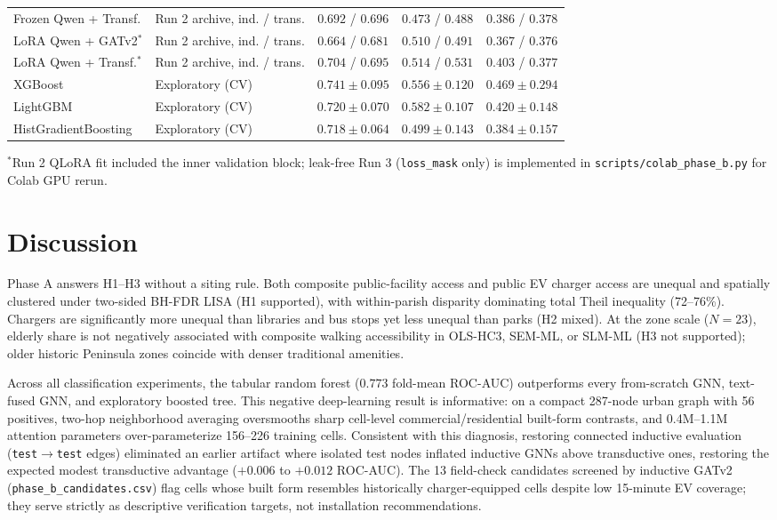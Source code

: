 \documentclass[11pt,a4paper]{article}
\begin{document}
\begin{table}[htbp]
{\begin{tabular}{llccc}
Frozen Qwen + Transf. & Run 2 archive, ind. / trans. & \(0.692\) / \(0.696\) & \(0.473\) / \(0.488\) & \(0.386\) / \(0.378\) \\
LoRA Qwen + GATv2\(^*\) & Run 2 archive, ind. / trans. & \(0.664\) / \(0.681\) & \(0.510\) / \(0.491\) & \(0.367\) / \(0.376\) \\
LoRA Qwen + Transf.\(^*\) & Run 2 archive, ind. / trans. & \(0.704\) / \(0.695\) & \(0.514\) / \(0.531\) & \(0.403\) / \(0.377\) \\
\midrule
XGBoost & Exploratory (CV) & \(0.741 \pm 0.095\) & \(0.556 \pm 0.120\) & \(0.469 \pm 0.294\) \\
LightGBM & Exploratory (CV) & \(0.720 \pm 0.070\) & \(0.582 \pm 0.107\) & \(0.420 \pm 0.148\) \\
HistGradientBoosting & Exploratory (CV) & \(0.718 \pm 0.064\) & \(0.499 \pm 0.143\) & \(0.384 \pm 0.157\) \\
\bottomrule
\end{tabular}
\par\vspace{0.25em}
{\scriptsize \(^*\)Run 2 QLoRA fit included the inner validation block; leak-free Run 3 (\texttt{loss\_mask} only) is implemented in \texttt{scripts/colab\_phase\_b.py} for Colab GPU rerun.}
}
\end{table}

\section{Discussion}
Phase A answers H1--H3 without a siting rule. Both composite public-facility access and public EV charger access are unequal and spatially clustered under two-sided BH-FDR LISA (H1 supported), with within-parish disparity dominating total Theil inequality (72--76\%). Chargers are significantly more unequal than libraries and bus stops yet less unequal than parks (H2 mixed). At the zone scale (\(N=23\)), elderly share is not negatively associated with composite walking accessibility in OLS-HC3, SEM-ML, or SLM-ML (H3 not supported); older historic Peninsula zones coincide with denser traditional amenities.

Across all classification experiments, the tabular random forest (\(0.773\) fold-mean ROC-AUC) outperforms every from-scratch GNN, text-fused GNN, and exploratory boosted tree. This negative deep-learning result is informative: on a compact 287-node urban graph with 56 positives, two-hop neighborhood averaging oversmooths sharp cell-level commercial/residential built-form contrasts, and 0.4M--1.1M attention parameters over-parameterize 156--226 training cells. Consistent with this diagnosis, restoring connected inductive evaluation (\texttt{test}\(\to\)\texttt{test} edges) eliminated an earlier artifact where isolated test nodes inflated inductive GNNs above transductive ones, restoring the expected modest transductive advantage (\(+0.006\) to \(+0.012\) ROC-AUC). The 13 field-check candidates screened by inductive GATv2 (\texttt{phase\_b\_candidates.csv}) flag cells whose built form resembles historically charger-equipped cells despite low 15-minute EV coverage; they serve strictly as descriptive verification targets, not installation recommendations.
\end{document}
